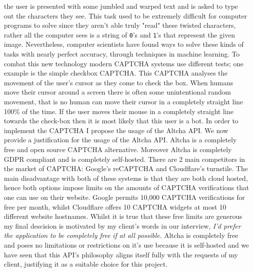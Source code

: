 the user is presented with some jumbled and warped text and is
asked to type out the characters they see. This task used to 
be extremely difficult for computer programs to solve since 
they aren't able truly "read" these twisted characters, rather
all the computer sees is a string of \texttt{0}'s and
\texttt{1}'s that represent the given image. Nevertheless, 
computer scientists have found ways to solve these kinds of 
tasks with nearly perfect accuracy, through techniques in 
machine learning. To combat this new technology modern CAPTCHA
systems use different tests; one example is the simple 
checkbox CAPTCHA. This CAPTCHA analyses the movement of the 
user's cursor as they come to check the box. When humans move 
their cursor around a screen there is often some unintentional
random movement, that is no human can move their cursor in a 
completely straight line 100\% of the time. If the user moves 
their mouse in a completely straight line towards the
check-box then it is most likely that this user is a bot. In 
order to implement the CAPTCHA I propose the usage of the 
Altcha API. We now provide a justification for the usage of
the Altcha API. Altcha is a completely free and open source
CAPTCHA alternative. Moreover Altcha is completely GDPR 
compliant and is completely self-hosted. There are 2 main 
competitors in the market of CAPTCHA: Google's reCAPTCHA and
Cloudflare's turnstile. The main disadvantage with both of 
these systems is that they are both cloud hosted, hence both 
options impose limits on the amounts of CAPTCHA verifications 
that one can use on their website. Google permits
10,000 CAPTCHA verifications for free per month, whilst
Cloudflare offers 10 CAPTCHA widgets at most 10 different 
website hostnames. Whilst it is true that these free limits 
are generous my final descision is motivated by my client's 
words in our interview, \textit{I'd prefer the application to
be completely free if at all possible.} Altcha is completely
free and poses no limitations or restrictions on it's use 
because it is self-hosted and we have seen that this API's 
philosophy aligns itself fully with the requests of my
client, justifying it as a suitable choice for this project.
\\ \vspace{0.2cm}

